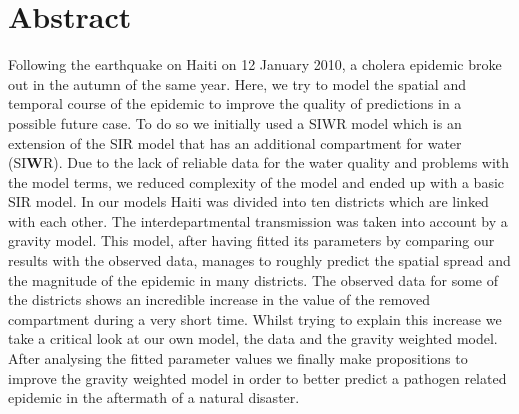 \documentclass[11pt]{article}
\begin{document}






\section*{Abstract}
Following the earthquake on Haiti on 12 January 2010, a cholera epidemic broke out in the autumn of the same year. Here, we try to model the spatial and temporal course of the epidemic to improve the quality of predictions in a possible future case. To do so we initially used a SIWR model which is an extension of the SIR model that has an additional compartment for water (SI\textbf{W}R). Due to the lack of reliable data for the water quality and problems with the model terms, we reduced complexity of the model and ended up with a basic SIR model. In our models Haiti was divided into ten districts which are linked with each other. The interdepartmental transmission was taken into account by a gravity model. This model, after having fitted its parameters by comparing our results with the observed data, manages to roughly predict the  spatial spread and the magnitude of the epidemic in many districts. The observed data for some of the districts shows an incredible increase in the value of the removed compartment during a very short time.
Whilst trying to explain this increase we take a critical look at our own model, the data and the gravity weighted model. After analysing the fitted parameter values we finally make propositions to improve the gravity weighted model in order to better predict a pathogen related epidemic in the aftermath of a natural disaster. 



\newpage


\tableofcontents

\newpage

\end{document}
